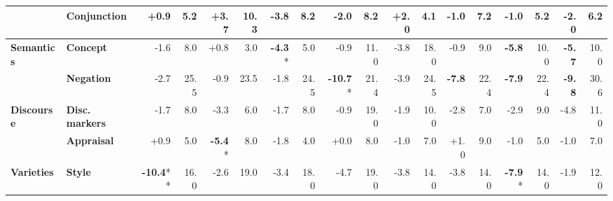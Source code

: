 \begin{table}[h]
{\begin{tabular}{llrrrrrrrrrrrrrrrr}
  & \textbf{Conjunction} & \cellcolor{green!1} +0.9 & \cellcolor{blue!4} 5.2 & \cellcolor{green!7} +3.7 & \cellcolor{blue!8} 10.3 & \cellcolor{red!7} -3.8 & \cellcolor{blue!6} 8.2 & \cellcolor{red!3} -2.0 & \cellcolor{blue!6} 8.2 & \cellcolor{green!3} +2.0 & \cellcolor{blue!3} 4.1 & \cellcolor{red!1} -1.0 & \cellcolor{blue!5} 7.2 & \cellcolor{red!2} -1.0 & \cellcolor{blue!4} 5.2 & \cellcolor{red!4} -2.0 & \cellcolor{blue!4} 6.2 \\
\midrule
\textbf{Semantics} & \textbf{Concept} & \cellcolor{red!3} -1.6 & \cellcolor{blue!6} 8.0 & \cellcolor{green!1} +0.8 & \cellcolor{blue!2} 3.0 & \cellcolor{red!8} \textbf{-4.3}* & \cellcolor{blue!4} 5.0 & \cellcolor{red!1} -0.9 & \cellcolor{blue!8} 11.0 & \cellcolor{red!7} -3.8 & \cellcolor{blue!14} 18.0 & \cellcolor{red!1} -0.9 & \cellcolor{blue!7} 9.0 & \cellcolor{red!11} \textbf{-5.8} & \cellcolor{blue!8} 10.0 & \cellcolor{red!11} \textbf{-5.7} & \cellcolor{blue!8} 10.0 \\
  & \textbf{Negation} & \cellcolor{red!5} -2.7 & \cellcolor{blue!20} 25.5 & \cellcolor{red!1} -0.9 & \cellcolor{blue!18} 23.5 & \cellcolor{red!3} -1.8 & \cellcolor{blue!19} 24.5 & \cellcolor{red!20} \textbf{-10.7}* & \cellcolor{blue!17} 21.4 & \cellcolor{red!7} -3.9 & \cellcolor{blue!19} 24.5 & \cellcolor{red!15} \textbf{-7.8} & \cellcolor{blue!17} 22.4 & \cellcolor{red!15} \textbf{-7.9} & \cellcolor{blue!17} 22.4 & \cellcolor{red!19} \textbf{-9.8} & \cellcolor{blue!24} 30.6 \\
\midrule
\textbf{Discourse} & \textbf{Disc. markers} & \cellcolor{red!3} -1.7 & \cellcolor{blue!6} 8.0 & \cellcolor{red!6} -3.3 & \cellcolor{blue!4} 6.0 & \cellcolor{red!3} -1.7 & \cellcolor{blue!6} 8.0 & \cellcolor{red!1} -0.9 & \cellcolor{blue!15} 19.0 & \cellcolor{red!3} -1.9 & \cellcolor{blue!8} 10.0 & \cellcolor{red!5} -2.8 & \cellcolor{blue!5} 7.0 & \cellcolor{red!5} -2.9 & \cellcolor{blue!7} 9.0 & \cellcolor{red!9} -4.8 & \cellcolor{blue!8} 11.0 \\
  & \textbf{Appraisal} & \cellcolor{green!1} +0.9 & \cellcolor{blue!4} 5.0 & \cellcolor{red!10} \textbf{-5.4}* & \cellcolor{blue!6} 8.0 & \cellcolor{red!3} -1.8 & \cellcolor{blue!3} 4.0 & \cellcolor{red!0} +0.0 & \cellcolor{blue!6} 8.0 & \cellcolor{red!1} -1.0 & \cellcolor{blue!5} 7.0 & \cellcolor{green!1} +1.0 & \cellcolor{blue!7} 9.0 & \cellcolor{red!1} -1.0 & \cellcolor{blue!4} 5.0 & \cellcolor{red!1} -1.0 & \cellcolor{blue!5} 7.0 \\
\midrule
\textbf{Varieties} & \textbf{Style} & \cellcolor{red!20} \textbf{-10.4}** & \cellcolor{blue!12} 16.0 & \cellcolor{red!5} -2.6 & \cellcolor{blue!15} 19.0 & \cellcolor{red!6} -3.4 & \cellcolor{blue!14} 18.0 & \cellcolor{red!9} -4.7 & \cellcolor{blue!15} 19.0 & \cellcolor{red!7} -3.8 & \cellcolor{blue!11} 14.0 & \cellcolor{red!7} -3.8 & \cellcolor{blue!11} 14.0 & \cellcolor{red!15} \textbf{-7.9}* & \cellcolor{blue!11} 14.0 & \cellcolor{red!3} -1.9 & \cellcolor{blue!9} 12.0 \\

\end{tabular}}
\end{table}
